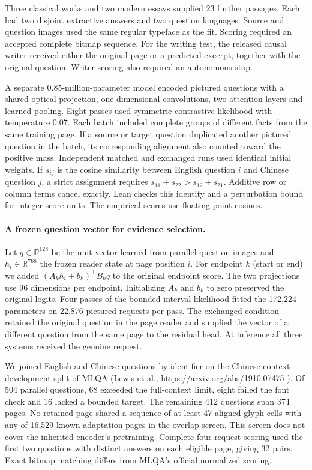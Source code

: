 \documentclass[12pt,a4paper]{article}
\providecommand{\DIFadd}[1]{{\protect\color{blue} \sf #1}} %
\begin{document}
\DIFadd{Three classical works and two modern essays supplied 23 further passages. Each had two disjoint extractive answers and two question languages. Source and question images used the same regular typeface as the fit. Scoring required an accepted complete bitmap sequence. For the writing test, the released causal writer received either the original page or a predicted excerpt, together with the original question. Writer scoring also required an autonomous stop.
}

\DIFadd{A separate 0.85-million-parameter model encoded pictured questions with a shared optical projection, one-dimensional convolutions, two attention layers and learned pooling. Eight passes used symmetric contrastive likelihood with temperature 0.07. Each batch included complete groups of different facts from the same training page. If a source or target question duplicated another pictured question in the batch, its corresponding alignment also counted toward the positive mass. Independent matched and exchanged runs used identical initial weights. If $s_{ij}$ is the cosine similarity between English question $i$ and Chinese question $j$, a strict assignment requires $s_{11}+s_{22}>s_{12}+s_{21}$. Additive row or column terms cancel exactly. Lean checks this identity and a perturbation bound for integer score units. The empirical scores use floating-point cosines.
}

\paragraph{\DIFadd{A frozen question vector for evidence selection.}}
\DIFadd{Let $q\in\mathbb{R}^{128}$ be the unit vector learned from parallel question images and $h_i\in\mathbb{R}^{768}$ the frozen reader state at page position $i$. For endpoint $k$ (start or end) we added $(A_k h_i+b_k)^\top B_k q$ to the original endpoint score. The two projections use 96 dimensions per endpoint. Initializing $A_k$ and $b_k$ to zero preserved the original logits. Four passes of the bounded interval likelihood fitted the 172,224 parameters on 22,876 pictured requests per pass. The exchanged condition retained the original question in the page reader and supplied the vector of a different question from the same page to the residual head. At inference all three systems received the genuine request.
}

\DIFadd{We joined English and Chinese questions by identifier on the Chinese-context development split of MLQA (Lewis et al., }\url{https://arxiv.org/abs/1910.07475}\DIFadd{). Of 504 parallel questions, 68 exceeded the full-context limit, eight failed the font check and 16 lacked a bounded target. The remaining 412 questions span 374 pages. No retained page shared a sequence of at least 47 aligned glyph cells with any of 16,529 known adaptation pages in the overlap screen. This screen does not cover the inherited encoder's pretraining. Complete four-request scoring used the first two questions with distinct answers on each eligible page, giving 32 pairs. Exact bitmap matching differs from MLQA's official normalized scoring.
}
\end{document}
